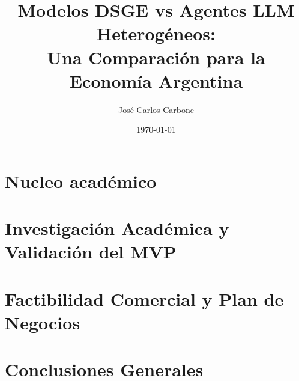\documentclass[12pt, a4paper, oneside]{book}
\title{%
  \textbf{Modelos DSGE vs Agentes LLM Heterogéneos:}\\[0.5em]
  \large Una Comparación para la Economía Argentina
}
\author{José Carlos Carbone}
\date{\today}
\begin{document}
\frontmatter
\maketitle
\tableofcontents
\listoffigures
\listoftables

\mainmatter
\part{Nucleo académico}




\part{Investigación Académica y Validación del MVP}





\part{Factibilidad Comercial y Plan de Negocios}





\part{Conclusiones Generales}

\backmatter

\printbibliography[heading=bibintoc, title={Referencias}]
\end{document}
